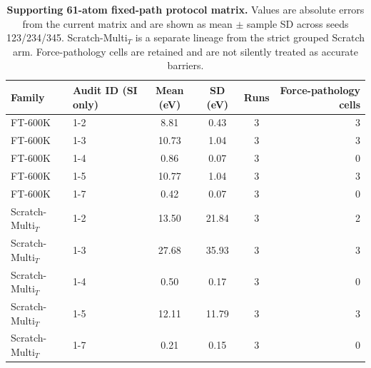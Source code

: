 \begin{table}[htbp]
\centering
\scriptsize
\caption{\textbf{Supporting 61-atom fixed-path protocol matrix.} Values are absolute errors from the current matrix and are shown as mean $\pm$ sample SD across seeds 123/234/345. Scratch-Multi$_T$ is a separate lineage from the strict grouped Scratch arm. Force-pathology cells are retained and are not silently treated as accurate barriers.}
\label{tab:a3_protocol_matrix}
\begin{tabular}{llcccr}
\toprule
Family & Audit ID (SI only) & Mean (eV) & SD (eV) & Runs & Force-pathology cells \\
\midrule
FT-600K & 1-2 & 8.81 & 0.43 & 3 & 3 \\
FT-600K & 1-3 & 10.73 & 1.04 & 3 & 3 \\
FT-600K & 1-4 & 0.86 & 0.07 & 3 & 0 \\
FT-600K & 1-5 & 10.77 & 1.04 & 3 & 3 \\
FT-600K & 1-7 & 0.42 & 0.07 & 3 & 0 \\
Scratch-Multi$_T$ & 1-2 & 13.50 & 21.84 & 3 & 2 \\
Scratch-Multi$_T$ & 1-3 & 27.68 & 35.93 & 3 & 3 \\
Scratch-Multi$_T$ & 1-4 & 0.50 & 0.17 & 3 & 0 \\
Scratch-Multi$_T$ & 1-5 & 12.11 & 11.79 & 3 & 3 \\
Scratch-Multi$_T$ & 1-7 & 0.21 & 0.15 & 3 & 0 \\
\bottomrule
\end{tabular}
\end{table}
